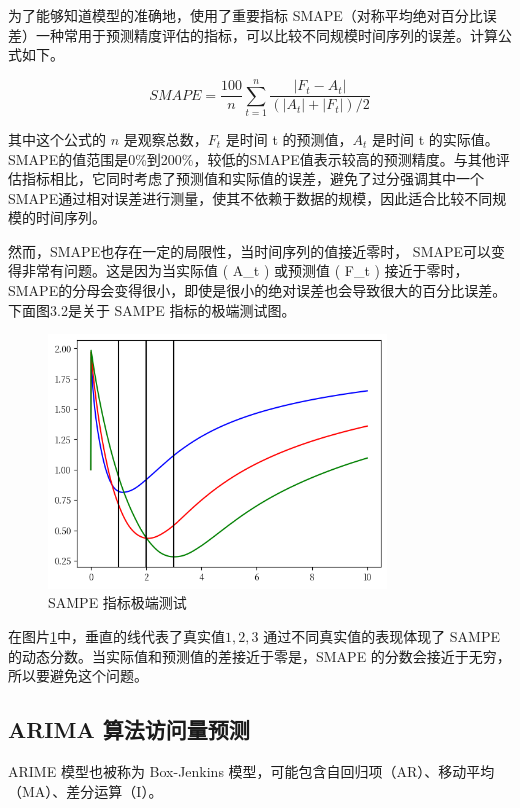 为了能够知道模型的准确地，使用了重要指标 SMAPE（对称平均绝对百分比误差）一种常用于预测精度评估的指标，可以比较不同规模时间序列的误差。计算公式如下。

\begin{equation}
	SMAPE={\frac{100}{n}}\sum_{t=1}^{n}{\frac{|F_{t}-A_{t}|}{(|A_{t}|+|F_{t}|)/2}}
\end{equation}

其中这个公式的 $n$ 是观察总数，$F_t$ 是时间 t 的预测值，$A_t$ 是时间 t 的实际值。
SMAPE的值范围是0\%到200\%，较低的SMAPE值表示较高的预测精度。与其他评估指标相比，它同时考虑了预测值和实际值的误差，避免了过分强调其中一个
SMAPE通过相对误差进行测量，使其不依赖于数据的规模，因此适合比较不同规模的时间序列。

然而，SMAPE也存在一定的局限性，当时间序列的值接近零时，
SMAPE可以变得非常有问题。这是因为当实际值 ( A\_t ) 或预测值 ( F\_t ) 接近于零时，SMAPE的分母会变得很小，即使是很小的绝对误差也会导致很大的百分比误差。下面图3.2是关于 SAMPE 指标的极端测试图。

\begin{figure}
	\centering
	\includegraphics[width=0.8\textwidth]{figures/sampe_external.png}
	\caption{SAMPE 指标极端测试}
	\label{sampe-property}
\end{figure}

在图片\ref{sampe-property}中，垂直的线代表了真实值$1 , 2, 3$ 通过不同真实值的表现体现了 SAMPE 的动态分数。当实际值和预测值的差接近于零是，SMAPE 的分数会接近于无穷，所以要避免这个问题。

\subsection{ARIMA 算法访问量预测}

ARIME 模型也被称为 Box-Jenkins 模型，可能包含自回归项（AR）、移动平均（MA）、差分运算（I）。

